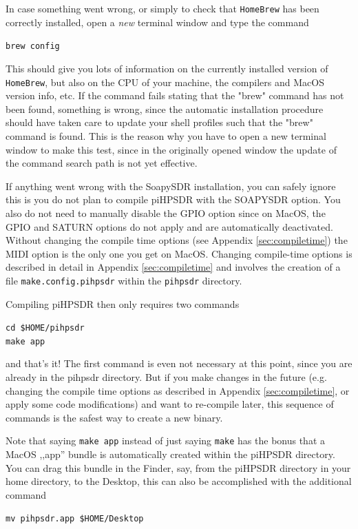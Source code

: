 \documentclass[12pt]{book}
\def\grtt#1{\texttt{\color{magenta}#1}}
\def\pH{pi\-HPSDR\xspace}
\begin{document}
 In case something went wrong, or simply to check that \texttt{HomeBrew} has been correctly installed,
 open a \textit{new} terminal window and type the command


\grtt{brew config}

 This should give you lots of information on the currently installed version of \texttt{HomeBrew},
 but also on the CPU of your machine, the compilers and MacOS version info, etc. If the command
 fails stating that the "brew" command has not been found, something is wrong, since the automatic
 installation procedure should have taken care to update your shell profiles such that the "brew"
 command is found. This is the reason why you have to open a new terminal window to make this test,
 since in the originally opened window the update of the command search path is not yet effective.

If anything went wrong with the SoapySDR installation, you can safely ignore this is
you do not plan to compile \pH with the SOAPYSDR option. You also do not need
to manually disable the GPIO option since on MacOS, the GPIO and SATURN options
do not apply and are automatically deactivated. Without changing the compile time
options (see Appendix \ref{sec:compiletime}) the MIDI option is the only one you get
on MacOS. Changing compile-time options is described in detail in Appendix \ref{sec:compiletime}
and involves the creation of a file \texttt{make.config.pihpsdr} within the \texttt{pihpsdr}
directory.

Compiling \pH then only requires two commands

\grtt{cd \$HOME/pihpsdr} \\
\grtt{make app}

and that's it! The first command is even not necessary at this point,
since you are already in the pihpsdr  directory.
But if you make changes in the future (e.g. changing the compile time options as described in
Appendix \ref{sec:compiletime}, or apply some code modifications)
and want to re-compile later, this sequence of commands is the safest way to create a new binary.

Note that saying \texttt{make app} instead of just saying \texttt{make} has the bonus
that a MacOS ,,app'' bundle is automatically created within the \pH directory.
You can drag this bundle in the Finder, say, from the \pH directory in your
home directory, to the Desktop, this can also be accomplished with the additional command

\grtt{mv pihpsdr.app \$HOME/Desktop}
\end{document}
